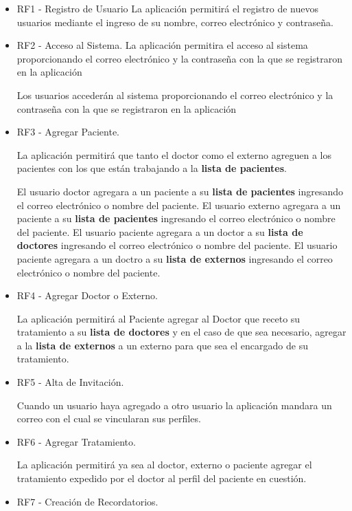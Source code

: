 \begin{itemize}
	\item RF1 - Registro de Usuario
	La aplicación permitirá el registro de nuevos usuarios mediante el ingreso de su nombre, correo electrónico y contraseña.
	
	\item RF2 - Acceso al Sistema.
	La aplicación permitira el acceso al sistema proporcionando el correo electrónico y la contraseña con la que se registraron en la aplicación
	
	Los usuarios accederán al sistema proporcionando el correo electrónico y la contraseña con la que se registraron en la aplicación
	
	\item RF3 - Agregar Paciente.
	 
	 La aplicación permitirá que tanto el doctor como el externo agreguen a los pacientes con los que están trabajando a la \textbf{lista de pacientes}.
	 
	El usuario doctor agregara a un paciente a su \textbf{lista de pacientes} ingresando el correo electrónico o nombre del paciente.
	El usuario externo agregara a un paciente a su \textbf{lista de pacientes} ingresando el correo electrónico o nombre del paciente.
	El usuario paciente agregara a un doctor a su \textbf{lista de doctores} ingresando el correo electrónico o nombre del paciente.
	El usuario paciente agregara a un doctro a su \textbf{lista de externos} ingresando el correo electrónico o nombre del paciente.

	\item RF4 - Agregar Doctor o Externo.
	
	La aplicación permitirá al Paciente agregar al Doctor que receto su tratamiento a su \textbf{lista de doctores} y en el caso de que sea necesario, agregar a la \textbf{lista de externos} a un externo para que sea el encargado de su tratamiento.
	
	\item RF5 - Alta de Invitación.
	
	Cuando un usuario haya agregado a otro usuario la aplicación mandara un correo con el cual se vincularan sus perfiles.
	
	\item RF6 - Agregar Tratamiento.
	
	La aplicación permitirá  ya sea al doctor, externo o paciente agregar el tratamiento expedido por el doctor al perfil del paciente en cuestión.
	
	\item RF7 - Creación de Recordatorios.
	

\end{itemize}
